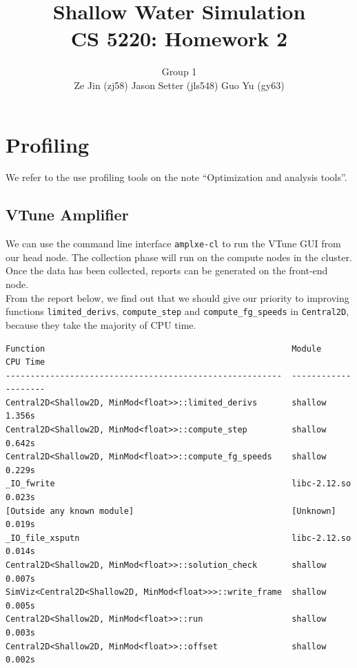 \documentclass[12pt]{article}
\numberwithin{equation}{section}
\begin{document}
\title{\bf{Shallow Water Simulation \\ CS 5220: Homework 2}}

\author{Group 1 \\ Ze Jin (zj58) \quad Jason Setter (jls548) \quad Guo Yu (gy63)\\}

\date{ }

\maketitle





\section{Profiling}

We refer to the use profiling tools on the note ``Optimization and analysis tools''.

\subsection{VTune Amplifier}

We can use the command line interface \texttt{amplxe-cl} to run the VTune GUI from our head node. The collection phase will run on the compute nodes in the cluster. Once the data has been collected, reports can be generated on the front-end node.
\\
From the report below, we find out that we should give our priority to improving functions \texttt{limited\_derivs}, \texttt{compute\_step} and \texttt{compute\_fg\_speeds} in \texttt{Central2D}, because they take the majority of CPU time.
\small{
\begin{verbatim}
Function                                                  Module        CPU Time
--------------------------------------------------------  ------------  --------
Central2D<Shallow2D, MinMod<float>>::limited_derivs       shallow         1.356s
Central2D<Shallow2D, MinMod<float>>::compute_step         shallow         0.642s
Central2D<Shallow2D, MinMod<float>>::compute_fg_speeds    shallow         0.229s
_IO_fwrite                                                libc-2.12.so    0.023s
[Outside any known module]                                [Unknown]       0.019s
_IO_file_xsputn                                           libc-2.12.so    0.014s
Central2D<Shallow2D, MinMod<float>>::solution_check       shallow         0.007s
SimViz<Central2D<Shallow2D, MinMod<float>>>::write_frame  shallow         0.005s
Central2D<Shallow2D, MinMod<float>>::run                  shallow         0.003s
Central2D<Shallow2D, MinMod<float>>::offset               shallow         0.002s
\end{verbatim}
}
\end{document}
